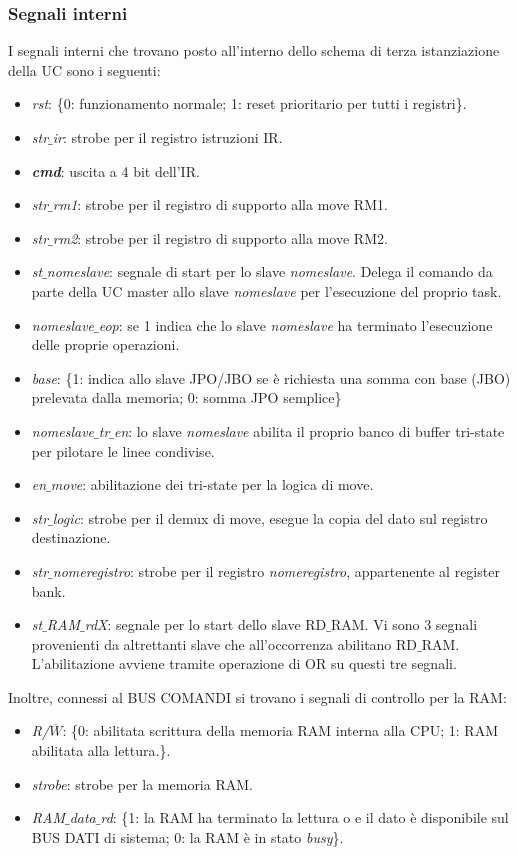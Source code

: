 \subsubsection{Segnali interni}
I segnali interni che trovano posto all'interno dello schema di terza istanziazione della UC sono i seguenti:
\begin{itemize}
	\item \textit{rst}: \{0: funzionamento normale; 1: reset prioritario per tutti i registri\}.
	\item \textit{str$\_$ir}: strobe per il registro istruzioni IR.
	\item \textit{\textbf{cmd}}: uscita a 4 bit dell'IR.
	\item \textit{str$\_$rm1}: strobe per il registro di supporto alla move RM1.
	\item \textit{str$\_$rm2}: strobe per il registro di supporto alla move RM2.
	\item \textit{st$\_$nomeslave}: segnale di start per lo slave \textit{nomeslave}. Delega il comando da parte della UC master allo slave \textit{nomeslave} per l'esecuzione del proprio task.
	\item \textit{nomeslave$\_$eop}: se 1 indica che lo slave \textit{nomeslave} ha terminato l'esecuzione delle proprie operazioni.
	\item \textit{base}: \{1: indica allo slave JPO/JBO se è richiesta una somma con base (JBO) prelevata dalla memoria; 0: somma JPO semplice\}\item \textit{nomeslave$\_$tr$\_$en}: lo slave \textit{nomeslave} abilita il proprio banco di buffer tri-state per pilotare le linee condivise.
	\item \textit{en$\_$move}: abilitazione dei tri-state per la logica di move.
	\item \textit{str$\_$logic}: strobe per il demux di move, esegue la copia del dato sul registro destinazione.
	\item \textit{str$\_$nomeregistro}: strobe per il registro \textit{nomeregistro}, appartenente al register bank.
	\item \textit{st$\_$RAM$\_$rdX}: segnale per lo start dello slave RD$\_$RAM. Vi sono 3 segnali provenienti da altrettanti slave che all'occorrenza abilitano RD$\_$RAM. L'abilitazione avviene tramite operazione di OR su questi tre segnali.
\end{itemize}
Inoltre, connessi al BUS COMANDI si trovano i segnali di controllo per la RAM:
\begin{itemize}
	\item \textit{R/$\overline{W}$}: \{0: abilitata scrittura della memoria RAM interna alla CPU; 1: RAM abilitata alla lettura.\}.
	\item \textit{strobe}: strobe per la memoria RAM.
	\item \textit{RAM$\_$data$\_$rd}: \{1: la RAM ha terminato la lettura o e il dato è disponibile sul BUS DATI di sistema; 0: la RAM è in stato \textit{busy}\}.
\end{itemize}

